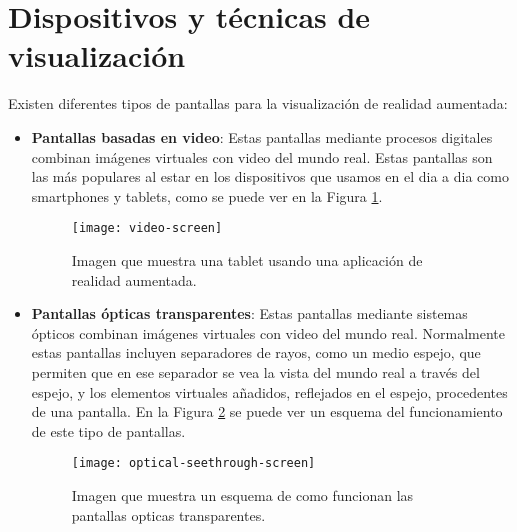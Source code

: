 \section{Dispositivos y técnicas de visualización \cite{billinghurst}}
Existen diferentes tipos de pantallas para la visualización de realidad aumentada:
\begin{itemize}
  \item \textbf{Pantallas basadas en video}: Estas pantallas mediante procesos digitales combinan imágenes virtuales con video del mundo real. Estas pantallas son las más populares al estar en los dispositivos que usamos en el dia a dia como smartphones y tablets, como se puede ver en la Figura \ref{figura-pantalla-video}.

  \begin{figure}[h]
    \centering
    \texttt{[image: video-screen]}
    \caption{Imagen que muestra una tablet usando una aplicación de realidad aumentada.\protect\footnotemark}
    \label{figura-pantalla-video}
  \end{figure}


  \newpage

  \item \textbf{Pantallas ópticas transparentes}: Estas pantallas mediante sistemas ópticos combinan imágenes virtuales con video del mundo real. Normalmente estas pantallas incluyen separadores de rayos, como un medio espejo, que permiten que en ese separador se vea la vista del mundo real a través del espejo, y los elementos virtuales añadidos, reflejados en el espejo, procedentes de una pantalla. En la Figura \ref{figura-pantalla-optica} se puede ver un esquema del funcionamiento de este tipo de pantallas.

  \begin{figure}[h]
    \centering
    \texttt{[image: optical-seethrough-screen]}
    \caption{Imagen que muestra un esquema de como funcionan las pantallas opticas transparentes.\protect\footnotemark}
    \label{figura-pantalla-optica}
  \end{figure}



\end{itemize}
